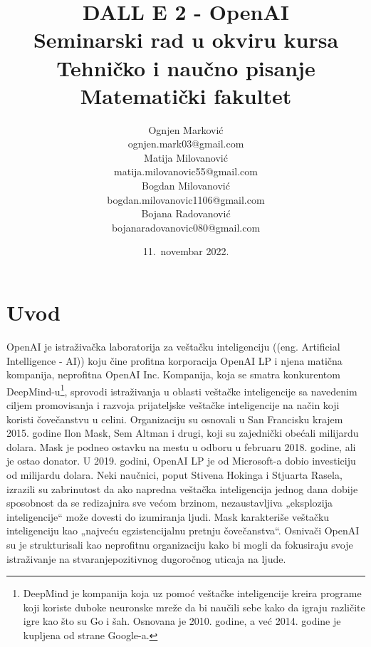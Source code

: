 \documentclass[a4paper]{article}
\begin{document}
\title{DALL E 2 - OpenAI\\ \small{Seminarski rad u okviru kursa\\Tehničko i naučno pisanje\\ Matematički fakultet}}
\author{Ognjen Marković\\ \small{ognjen.mark03@gmail.com}\\ Matija Milovanović\\ \small{matija.milovanovic55@gmail.com}\\ Bogdan Milovanović\\ \small{bogdan.milovanovic1106@gmail.com}\\ Bojana Radovanović\\ \small{bojanaradovanovic080@gmail.com} }
\date{11.~novembar 2022.}
\maketitle
{}
\tableofcontents
\newpage
\section{Uvod}
\label{sec:uvod}
OpenAI je istraživačka laboratorija za veštačku inteligenciju ((eng. Artificial Intelligence - AI)) koju čine profitna korporacija OpenAI LP i njena matična kompanija, neprofitna OpenAI Inc. Kompanija, koja se smatra konkurentom DeepMind-u\footnote{DeepMind je kompanija koja uz pomoć veštačke inteligencije kreira programe koji koriste duboke neuronske mreže da bi naučili sebe kako da igraju različite igre kao što su Go i šah. Osnovana je 2010. godine, a već 2014. godine je kupljena od strane Google-a.}, sprovodi istraživanja u oblasti veštačke inteligencije sa navedenim ciljem promovisanja i razvoja prijateljske veštačke inteligencije na način koji koristi čovečanstvu u celini. Organizaciju su osnovali u San Francisku krajem 2015. godine Ilon Mask, Sem Altman i drugi, koji su zajednički obećali milijardu dolara. Mask je podneo ostavku na mestu u odboru u februaru 2018. godine, ali je ostao donator. U 2019. godini, OpenAI LP je od Microsoft-a dobio investiciju od milijardu dolara. Neki naučnici, poput Stivena Hokinga i Stjuarta Rasela, izrazili su zabrinutost da ako napredna veštačka inteligencija jednog dana dobije sposobnost da se redizajnira sve većom brzinom, nezaustavljiva „eksplozija inteligencije“ može dovesti do izumiranja ljudi. Mask karakteriše veštačku inteligenciju kao „najveću egzistencijalnu pretnju čovečanstva“. Osnivači OpenAI su je strukturisali kao neprofitnu organizaciju kako bi mogli da fokusiraju svoje istraživanje na stvaranjepozitivnog dugoročnog uticaja na ljude\cite{1}.
\end{document}
